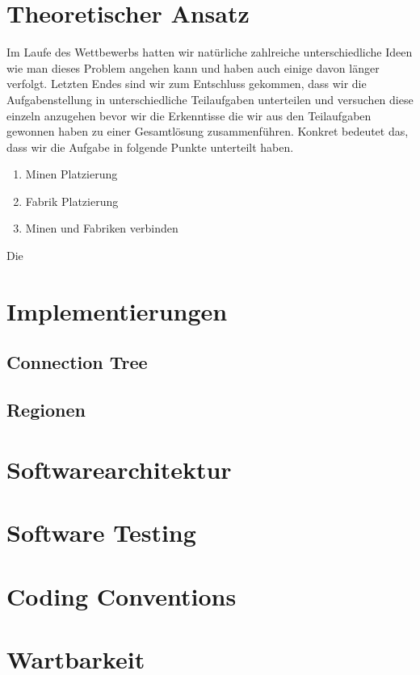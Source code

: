 \documentclass[12pt,a4paper]{article}
\begin{document}
\section{Theoretischer Ansatz}
Im Laufe des Wettbewerbs hatten wir natürliche zahlreiche unterschiedliche Ideen wie man dieses Problem angehen kann und haben auch einige davon länger verfolgt. Letzten Endes sind wir zum Entschluss gekommen, dass wir die Aufgabenstellung in unterschiedliche Teilaufgaben unterteilen und versuchen diese einzeln anzugehen bevor wir die Erkenntisse die wir aus den Teilaufgaben gewonnen haben zu einer Gesamtlösung zusammenführen. Konkret bedeutet das, dass wir die Aufgabe in folgende Punkte unterteilt haben.

\begin{enumerate}
    \item Minen Platzierung
    \item Fabrik Platzierung
    \item Minen und Fabriken verbinden
\end{enumerate}

Die 
\section{Implementierungen}

\subsection{Connection Tree}

\subsection{Regionen}


\section{Softwarearchitektur}

\section{Software Testing}

\section{Coding Conventions}

\section{Wartbarkeit}
\end{document}
